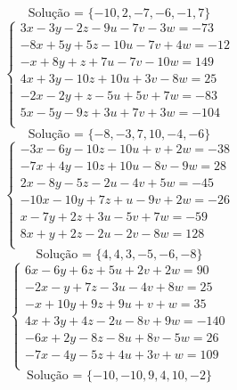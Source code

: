 \documentclass[12pt,oneside,a4paper]{article}
\begin{document}
\begin{equation*}
\text{Solução = }\{-10,2,-7,-6,-1,7\}
\end{equation*}
\vspace{\baselineskip}
\begin{equation*}
\begin{cases}
3x-3y-2z-9u-7v-3w=-73 \\
-8x+5y+5z-10u-7v+4w=-12 \\
-x+8y+z+7u-7v-10w=149 \\
4x+3y-10z+10u+3v-8w=25 \\
-2x-2y+z-5u+5v+7w=-83 \\
5x-5y-9z+3u+7v+3w=-104 \\
\end{cases}
\end{equation*}
\begin{equation*}
\text{Solução = }\{-8,-3,7,10,-4,-6\}
\end{equation*}
\vspace{\baselineskip}
\begin{equation*}
\begin{cases}
-3x-6y-10z-10u+v+2w=-38 \\
-7x+4y-10z+10u-8v-9w=28 \\
2x-8y-5z-2u-4v+5w=-45 \\
-10x-10y+7z+u-9v+2w=-26 \\
x-7y+2z+3u-5v+7w=-59 \\
8x+y+2z-2u-2v-8w=128 \\
\end{cases}
\end{equation*}
\begin{equation*}
\text{Solução = }\{4,4,3,-5,-6,-8\}
\end{equation*}
\vspace{\baselineskip}
\begin{equation*}
\begin{cases}
6x-6y+6z+5u+2v+2w=90 \\
-2x-y+7z-3u-4v+8w=25 \\
-x+10y+9z+9u+v+w=35 \\
4x+3y+4z-2u-8v+9w=-140 \\
-6x+2y-8z-8u+8v-5w=26 \\
-7x-4y-5z+4u+3v+w=109 \\
\end{cases}
\end{equation*}
\begin{equation*}
\text{Solução = }\{-10,-10,9,4,10,-2\}
\end{equation*}
\end{document}

